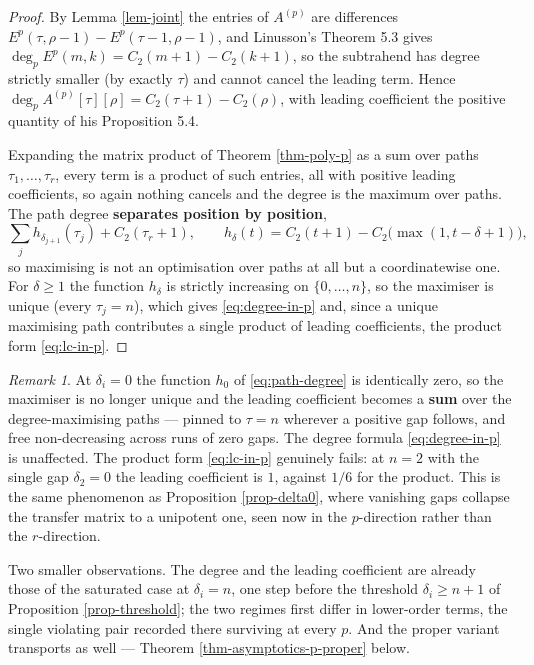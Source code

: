 \documentclass[11pt, a4paper, abstract=yes]{scrartcl}
\theoremstyle{definition}
\theoremstyle{remark}
\newtheorem{remark}[definition]{Remark}
\theoremstyle{plain}
\begin{document}
\begin{proof}
By Lemma \ref{lem-joint} the entries of \(A^{(p)}\) are differences \(E^p(\tau,\rho-1)-E^p(\tau-1,\rho-1)\),
and Linusson's Theorem 5.3 gives \(\deg_pE^p(m,k)=C_2(m+1)-C_2(k+1)\), so the subtrahend has degree
strictly smaller (by exactly \(\tau\)) and cannot cancel the leading term. Hence
\(\deg_pA^{(p)}[\tau][\rho]=C_2(\tau+1)-C_2(\rho)\), with leading coefficient the positive quantity
of his Proposition 5.4.

Expanding the matrix product of Theorem \ref{thm-poly-p} as a sum over paths
\(\tau_1,\dots,\tau_r\), every term is a product of such entries, all with positive leading
coefficients, so again nothing cancels and the degree is the maximum over paths. The path degree
\textbf{separates position by position},
\begin{equation}\label{eq:path-degree}
  \sum_{j}h_{\delta_{j+1}}(\tau_j)+C_2(\tau_r+1),
  \qquad h_\delta(t)=C_2(t+1)-C_2\bigl(\max(1,t-\delta+1)\bigr),
\end{equation}
so maximising is not an optimisation over paths at all but a coordinatewise one. For \(\delta\ge1\)
the function \(h_\delta\) is strictly increasing on \(\lbrace0,\dots,n\rbrace\), so the maximiser is
unique (every \(\tau_j=n\)), which gives \eqref{eq:degree-in-p} and, since a unique maximising
path contributes a single product of leading coefficients, the product form \eqref{eq:lc-in-p}.
\end{proof}

\begin{remark}
At \(\delta_i=0\) the function \(h_0\) of \eqref{eq:path-degree} is identically zero, so the
maximiser is no longer unique and the leading coefficient becomes a \textbf{sum} over the degree-maximising
paths --- pinned to \(\tau=n\) wherever a positive gap follows, and free non-decreasing across runs
of zero gaps. The degree formula \eqref{eq:degree-in-p} is unaffected. The product form
\eqref{eq:lc-in-p} genuinely fails: at \(n=2\) with the single gap \(\delta_2=0\) the leading
coefficient is \(1\), against \(1/6\) for the product. This is the same phenomenon as
Proposition \ref{prop-delta0}, where vanishing gaps collapse the transfer matrix to a unipotent one,
seen now in the \(p\)-direction rather than the \(r\)-direction.

Two smaller observations. The degree and the leading coefficient are already those of the saturated
case at \(\delta_i=n\), one step before the threshold \(\delta_i\ge n+1\) of
Proposition \ref{prop-threshold}; the two regimes first differ in lower-order terms, the single
violating pair recorded there surviving at every \(p\). And the proper variant transports as
well --- Theorem \ref{thm-asymptotics-p-proper} below.
\label{rem-asymptotics-zero-gaps}
\end{remark}
\end{document}
